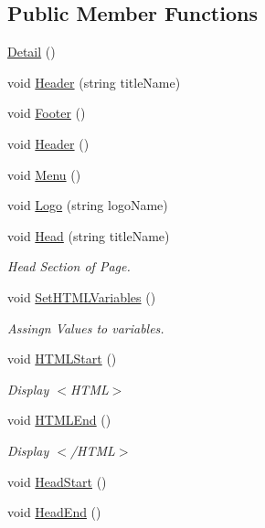 \subsection*{Public Member Functions}
\begin{DoxyCompactItemize}
\item 
\hyperlink{classDetail_ade0deea5232733e7bdb658dadcc6b5fe}{Detail} ()
\item 
void \hyperlink{classDetail_acc0ccf3b289e9b1c9494a74727e60183}{Header} (string title\-Name)
\item 
void \hyperlink{classDetail_a4744b0917a632c5a5ca5418b240be7b3}{Footer} ()
\item 
void \hyperlink{classPageLayout_a7726061f0653245f644a05807fa92472}{Header} ()
\item 
void \hyperlink{classPageLayout_a49af1dca286bbee9432192a7b3c00332}{Menu} ()
\item 
void \hyperlink{classPageLayout_ae60235c6af48e3ebbc6343d02456da0c}{Logo} (string logo\-Name)
\item 
void \hyperlink{classPageLayout_ae50907d56f0ba7a85f7ccfdeafa45bcc}{Head} (string title\-Name)
\begin{DoxyCompactList}\small\item\em Head Section of Page. \end{DoxyCompactList}\item 
void \hyperlink{classHTMLTags_abe32ec84b6b2940afbc993be2db178e9}{Set\-H\-T\-M\-L\-Variables} ()
\begin{DoxyCompactList}\small\item\em Assingn Values to variables. \end{DoxyCompactList}\item 
void \hyperlink{classHTMLTags_a567551cd701d2836d4240b2917b5e13f}{H\-T\-M\-L\-Start} ()
\begin{DoxyCompactList}\small\item\em Display $<$\-H\-T\-M\-L$>$ \end{DoxyCompactList}\item 
void \hyperlink{classHTMLTags_a6553c3d01ee194a1d157e6341333dee3}{H\-T\-M\-L\-End} ()
\begin{DoxyCompactList}\small\item\em Display $<$/\-H\-T\-M\-L$>$ \end{DoxyCompactList}\item 
void \hyperlink{classHTMLTags_af2b01cc08884af52e0b291d07035062e}{Head\-Start} ()
\item 
void \hyperlink{classHTMLTags_afdc779e46fac16cc79e4f0e87f621254}{Head\-End} ()

\end{DoxyCompactItemize}
